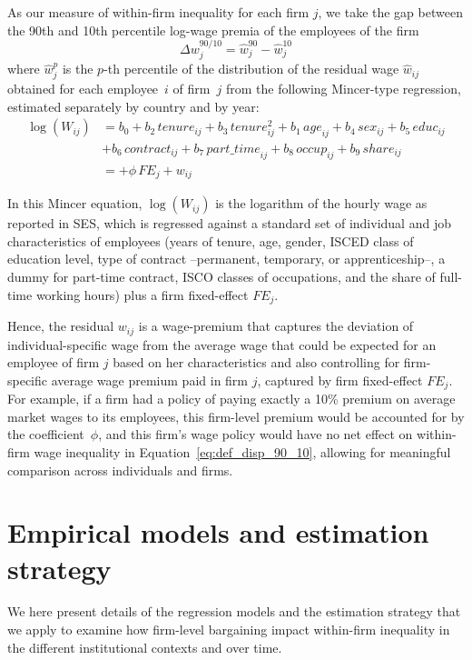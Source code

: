\documentclass[12pt]{article}
\begin{document}
As our measure of within-firm inequality for each firm $j$, we take the gap between the 90th and 10th percentile log-wage premia of the employees of the firm
\begin{equation}
  \label{eq:def_disp_90_10}
  \Delta w^{90/10}_j=\hat{w}^{90}_j - \hat{w}^{10}_j
\end{equation}
\noindent where $\hat{w}^p_j$ is the $p$-th percentile of the distribution of the residual wage $\hat{w}_{ij}$ obtained for each employee~$i$ of firm~$j$ from the following Mincer-type regression, estimated separately by country and by year:
\begin{equation}
\label{eq:mincer}
\begin{split}
\log \left(W_{ij} \right)
&= b_0 + b_2\,\mathit{tenure}_{ij} + b_3\,\mathit{tenure}_{ij}^2 + b_1\,\mathit{age}_{ij} + b_4\,\mathit{sex}_{ij} + b_5\,\mathit{educ}_{ij} \\
&+ b_6\,\mathit{contract}_{ij} + b_7\,\mathit{part\_time}_{ij} + b_8\,\mathit{occup}_{ij} + b_9\,\mathit{share}_{ij} \\
&= + \phi \,\mathit{FE}_j + w_{ij}
\end{split}
\end{equation}

In this Mincer equation, $\log \left(W_{ij} \right)$ is the logarithm of the hourly wage as reported in SES, which is regressed against a standard set of individual and job characteristics of employees (years of tenure, age, gender, ISCED class of education level, type of contract --permanent, temporary, or apprenticeship--, a dummy for part-time contract, ISCO classes of occupations, and the share of full-time working hours) plus a firm fixed-effect $\mathit{FE}_j$. 

Hence, the residual $w_{ij}$ is a wage-premium that captures the deviation of individual-specific wage from the average wage that could be expected for an employee of firm $j$ based on her characteristics and also controlling for firm-specific average wage premium paid in firm $j$, captured by firm fixed-effect $\mathit{FE}_j$. For example, if a firm had a policy of paying exactly a 10\% premium on average market wages to its employees, this firm-level premium would be accounted for by the coefficient~$\phi$, and this firm's wage policy would have no net effect on within-firm wage inequality in Equation~\eqref{eq:def_disp_90_10}, allowing for meaningful comparison across individuals and firms. 


\section*{Empirical models and estimation strategy}
\label{sec:empirics}
We here present details of the regression models and the estimation strategy that we apply to examine how firm-level bargaining impact within-firm inequality in the different institutional contexts and over time.
\end{document}
